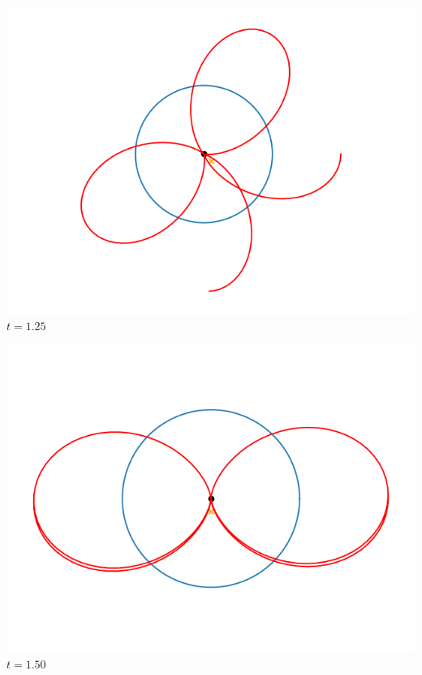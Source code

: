 \documentclass[11pt,class=report,crop=false]{standalone}
\begin{document}
\begin{center}
	\begin{minipage}{0.23\textwidth}
	\center \includegraphics[scale=\myscale,scale=0.3]{figures/fourier-6-125}
	$t = 1.25$ 
	\end{minipage}
	\begin{minipage}{0.27\textwidth}
	\center \includegraphics[scale=\myscale,scale=0.3]{figures/fourier-6-150}
	$t = 1.50$ 
	\end{minipage}
	\begin{minipage}{0.24\textwidth}

\end{minipage}
\end{center}
\end{document}
